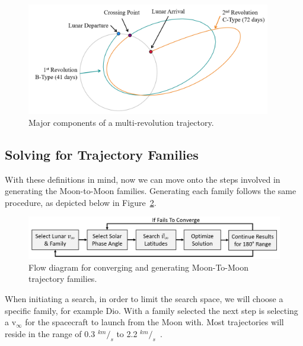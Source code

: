 \documentclass[letterpaper, paper,11pt]{AAS}	%
\begin{document}
\begin{figure}[h]
    \centering
    \includegraphics[trim=0 10 0 10, clip, width=4.2in]{./etc/src (1).png}
    \caption{Major components of a multi-revolution trajectory.}%
    \label{fig:revs}
\end{figure}


\subsection*{Solving for Trajectory Families}

With these definitions in mind, now we can move onto the steps involved in generating the Moon-to-Moon families. Generating each family follows the same procedure, as depicted below in Figure~\ref{fig:flow}.

\begin{figure}[h]
    \centering
    \includegraphics[width=5in]{./etc/src (2).png}
    \caption{Flow diagram for converging and generating Moon-To-Moon trajectory families.}%
    \label{fig:flow}
\end{figure}

When initiating a search, in order to limit the search space, we will choose a specific family, for example Dio. With a family selected the next step is selecting a v\(_\infty\) for the spacecraft to launch from the Moon with. Most trajectories will reside in the range of 0.3 \(^{km}/_s\) to 2.2 \(^{km}/_s\)~\cite{Lantoine2014}.
\end{document}
